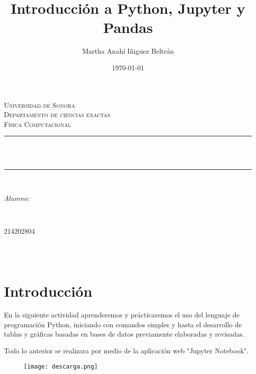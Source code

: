 \documentclass[12pt]{article}
\title{Introducción a Python, Jupyter y Pandas}								%
\author{Martha Anahí Iñiguez Beltrán}						%
\date{\today}											%
\makeatletter
\let\thetitle\@title
\let\theauthor\@author
\let\thedate\@date
\makeatother
\begin{document}
\begin{titlepage}
\centering
    \vspace*{0.5 cm}

    \textsc{\LARGE Universidad de Sonora}\\[2.0 cm]	%
    \textsc{\Large Departamento de ciencias exactas}\\[1.0 cm]
\textsc{\Large Física Computacional}\\[0.5 cm]
\rule{\linewidth}{0.2 mm} \\[0.4 cm]
{ \huge \bfseries \thetitle}\\
\rule{\linewidth}{0.2 mm} \\[1.5 cm]
\begin{minipage}{0.6\textwidth}
\begin{flushleft} \large
\emph{Alumno:}\\
\theauthor
\end{flushleft}
\end{minipage}~
\begin{minipage}{0.4\textwidth}
\begin{flushright} \large
214202804
\end{flushright}
\end{minipage}\\[2 cm]


{\large \thedate}\\[2 cm]

\vfill

\end{titlepage}

\tableofcontents
\pagebreak


\section{Introducción}
\noindent

En la siguiente actividad aprenderemos y prácticaremos el uso del lenguaje de programación Python, iniciando con comandos simples y hasta el desarrollo de tablas y gráficas basadas en bases de datos previamente elaboradas y revisadas.

Todo lo anterior se realizara por medio de la aplicación web "Jupyter Notebook".

\begin{centering}
\centering
\begin{figure}
  \texttt{[image: descarga.png]}
\end{figure}
\end{centering}
\end{document}
